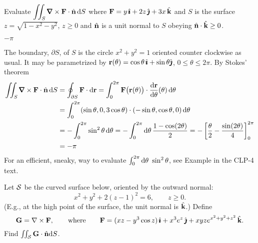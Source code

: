 \begin{question}[M317 2004A] %
Evaluate $\displaystyle\dblInt_S\vnabla\times\vF\cdot\hn\,\dee{S}$ where
$\mathbf{F}=y\,\hat{\pmb{\imath}}+2z\,\hat{\pmb{\jmath}}+3x\,\hat{\mathbf{k}}$ and $S$ is the surface $z=\sqrt{1-x^2-y^2}$,
$z\ge 0$ and $\hat{\mathbf{n}}$ is a unit normal to $S$ obeying $\hat{\mathbf{n}}\cdot\hat{\mathbf{k}}\ge 0$.
\end{question}


\begin{answer} 
$-\pi$
\end{answer}


\begin{solution}
 The boundary, $\partial S$, of $S$ is the circle $x^2+y^2=1$
oriented counter clockwise as usual. It may be parametrized by
$\mathbf{r}(\theta)=\cos\theta\,\hat{\pmb{\imath}}+\sin\theta\hat{\pmb{\jmath}}$, $0\le\theta\le 2\pi$. By Stokes' theorem
\begin{align*}
\dblInt_S\vnabla\times\vF\cdot\hn\,\dee{S}
&=\oint_{\partial S} \vF\cdot\dee{\vr}
=\int_0^{2\pi}\vF\big(\vr(\theta)\big)\cdot\diff{\vr}{\theta}(\theta)
       \,\dee{\theta} \\
& =\int_0^{2\pi}(\sin\theta,0,3\cos\theta)\cdot(-\sin\theta,\cos\theta,0)
        \,\dee{\theta} \\
&=-\int_0^{2\pi}\sin^2\theta\,\dee{\theta}
=-\int_0^{2\pi}\dee{\theta}\,\frac{1-\cos(2\theta)}{2}
=-\left[\frac{\theta}{2}-\frac{\sin(2\theta)}{4}\right]_0^{2\pi} \\
&=-\pi
\end{align*}
For an efficient, sneaky, way to evaluate 
$\int_0^{2\pi}\mathrm{d}\theta\ \sin^2\theta$, see Example
 in the CLP-4 text.
\end{solution}


\begin{question}[M317 2000D] %
Let $\mathcal{S}$ be the curved surface below, oriented by the outward normal:
$$
x^2 + y^2 + 2(z-1)^2 = 6,\qquad z\ge 0.
$$
(E.g., at the high point of the surface, the unit normal is $\hat{\mathbf{k}}$.) 
Define 
$$
\mathbf{G} = \nabla\times\mathbf{F},
\qquad{\rm where}\qquad
\mathbf{F} = (xz - y^3\cos z)\,\hat{\pmb{\imath}} + x^3 e^z\,\hat{\pmb{\jmath}} + xyze^{x^2+y^2+z^2}\,\hat{\mathbf{k}}.
$$
Find $\iint_{\mathcal{S}} \mathbf{G}\cdot \hat{\mathbf{n}}\mathrm{d}S$.

\end{question}


